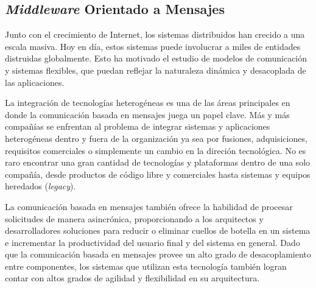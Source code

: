 \documentclass[11pt, twoside]{report}
\begin{document}
%






\subsection{\emph{Middleware} Orientado a Mensajes} \label{sec:mom}

Junto con el crecimiento de Internet, los sistemas distribuidos han crecido a una escala masiva. Hoy en día, estos sistemas puede involucrar a miles de entidades distruidas globalmente. Esto ha motivado el estudio de modelos de comunicación y sistemas flexibles, que puedan reflejar la naturaleza dinámica y desacoplada de las aplicaciones.

La integración de tecnologías heterogéneas es una de las áreas principales en donde la comunicación basada en mensajes juega un papel clave. Más y más compañías se enfrentan al problema de integrar sistemas y aplicaciones heterogéneas dentro y fuera de la organización ya sea por fusiones, adquisiciones, requisitos comerciales o simplemente un cambio en la direción tecnológica. No es raro encontrar una gran cantidad de tecnologías y plataformas dentro de una solo compañía, desde productos de código libre y comerciales hasta sistemas y equipos heredados (\emph{legacy}).

La comunicación basada en mensajes también ofrece la habilidad de procesar solicitudes de manera asincrónica, proporcionando a los arquitectos y desarrolladores soluciones para reducir o eliminar cuellos de botella en un sistema e incrementar la productividad del usuario final y del sistema en general. Dado que la comunicación basada en mensajes provee un alto grado de desacoplamiento entre componentes, los sistemas que utilizan esta tecnología también logran contar con altos grados de agilidad y flexibilidad en su arquitectura.
\end{document}
